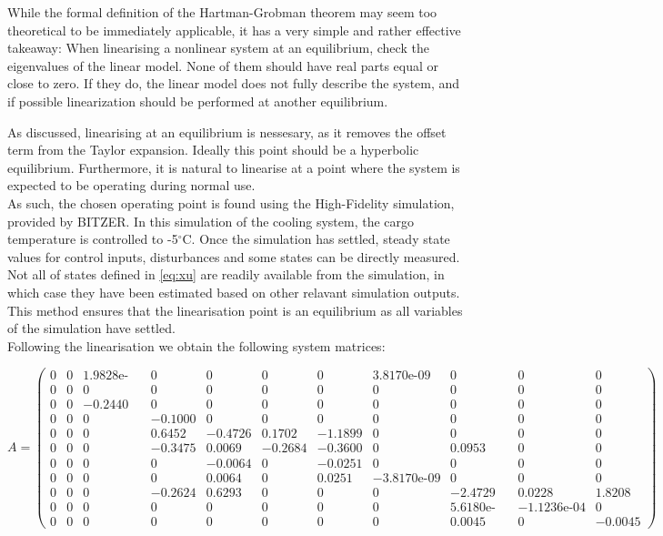 While the formal definition of the Hartman-Grobman theorem may seem too theoretical to be immediately applicable, it has a very simple and rather effective takeaway: When linearising a nonlinear system at an equilibrium, check the eigenvalues of the linear model. None of them should have real parts equal or close to zero. If they do, the linear model does not fully describe the system, and if possible linearization should be performed at another equilibrium.


As discussed, linearising at an equilibrium is nessesary, as it removes the offset term from the Taylor expansion. Ideally this point should be a hyperbolic equilibrium. Furthermore, it is natural to linearise at a point where the system is expected to be operating during normal use. \\

As such, the chosen operating point is found using the High-Fidelity simulation, provided by BITZER. In this simulation of the cooling system, the cargo temperature is controlled to -5$^{\circ}$C. Once the simulation has settled, steady state values for control inputs, disturbances and some states can be directly measured. Not all of states defined in \cref{eq:xu} are readily available from the simulation, in which case they have been estimated based on other relavant simulation outputs. This method ensures that the linearisation point is an equilibrium as all variables of the simulation have settled.\\


Following the linearisation we obtain the following system matrices:

\begin{equation}  \label{eq:A_full}
	A =
	\left(\begin{array}{ccccccccccc}
		0 & 0 & \text{1.9828e-04} & 0 & 0 & 0 & 0 & \text{3.8170e-09} & 0 & 0 & 0\\
		0 & 0 & 0 & 0 & 0 & 0 & 0 & 0 & 0 & 0 & 0\\
		0 & 0 & -0.2440 & 0 & 0 & 0 & 0 & 0 & 0 & 0 & 0\\
		0 & 0 & 0 & -0.1000 & 0 & 0 & 0 & 0 & 0 & 0 & 0\\
		0 & 0 & 0 & 0.6452 & -0.4726 & 0.1702 & -1.1899 & 0 & 0 & 0 & 0\\
		0 & 0 & 0 & -0.3475 & 0.0069 & -0.2684 & -0.3600 & 0 & 0.0953 & 0 & 0\\
		0 & 0 & 0 & 0 & -0.0064 & 0 & -0.0251 & 0 & 0 & 0 & 0\\
		0 & 0 & 0 & 0 & 0.0064 & 0 & 0.0251 & -\text{3.8170e-09} & 0 & 0 & 0\\
		0 & 0 & 0 & -0.2624 & 0.6293 & 0 & 0 & 0 & -2.4729 & 0.0228 & 1.8208\\
		0 & 0 & 0 & 0 & 0 & 0 & 0 & 0 & \text{5.6180e-05} & -\text{1.1236e-04} & 0\\
		0 & 0 & 0 & 0 & 0 & 0 & 0 & 0 & 0.0045 & 0 & -0.0045
	\end{array}\right)
\end{equation}


